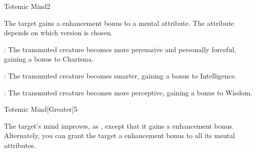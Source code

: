 \begin{spellsection}{Totemic Mind}{2}
\begin{spellheader}
    \begin{spelltargetinginfo}
    \end{spelltargetinginfo}
\end{spellheader}
\begin{spellcontent}
    \begin{spelleffects}
        \spelleffect The target gains a  enhancement bonus to a mental attribute. The attribute depends on which version is chosen.
        \par {}: The transmuted creature becomes more persuasive and personally forceful, gaining a bonus to Charisma.
        \par {}: The transmuted creature becomes smarter, gaining a bonus to Intelligence.
        \par {}: The transmuted creature becomes more perceptive, gaining a bonus to Wisdom.
        \spelldur \durshort
    \end{spelleffects}
\end{spellcontent}
\begin{spellfooter}
\end{spellfooter}
\end{spellsection}

\begin{spellsection}{Totemic Mind}[Greater]{5}
\begin{spellheader}
    \begin{spelltargetinginfo}
    \end{spelltargetinginfo}
\end{spellheader}
\begin{spellcontent}
    \begin{spelleffects}
        \spelleffect The target's mind improves, as , except that it gains a  enhancement bonus. Alternately, you can grant the target a  enhancement bonus to all its mental attributes.
        \spelldur \durshort
    \end{spelleffects}
\end{spellcontent}
\begin{spellfooter}
\end{spellfooter}
\end{spellsection}

